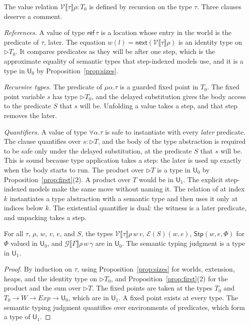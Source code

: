 \documentclass[acmsmall,nonacm,screen]{acmart}
\newcommand{\later}{{\triangleright}}
\newcommand{\nxt}{\mathsf{next}}
\newcommand{\Uv}{\mathsf{U}}
\newcommand{\sem}[1]{\llbracket #1 \rrbracket}
\newcommand{\kw}[1]{\mathsf{#1}}
\newcommand{\Exp}{\mathit{Exp}}
\newcommand{\Wld}{W}
\newcommand{\Pred}{T}
\newcommand{\Stp}{\mathsf{Stp}}
\newcommand{\Er}{\mathcal{E}}
\newcommand{\Vr}{\mathcal{V}}
\newcommand{\Gr}{\mathcal{G}}
\begin{document}
The value relation $\Vr\sem{\tau}\rho : \Pred_0$ is defined by recursion on the type
$\tau$. Three clauses deserve a comment.

\emph{References.} A value of type $\kw{ref}\,\tau$ is a location whose entry in the world
is the predicate of $\tau$, later. The equation $w(l) = \nxt(\Vr\sem{\tau}\rho)$ is an
identity type on $\later\Pred_0$. It compares predicates as they will be after one step,
which is the approximate equality of semantic types that step-indexed models use, and it is
a type in $\Uv_0$ by Proposition~\ref{prop:sizes}.

\emph{Recursive types.} The predicate of $\mu\alpha.\tau$ is a guarded fixed point in
$\Pred_0$. The fixed point variable $s$ has type $\later\Pred_0$, and the delayed
substitution gives the body access to the predicate $S$ that $s$ will be. Unfolding a
value takes a step, and that step removes the later.

\emph{Quantifiers.} A value of type $\forall\alpha.\tau$ is safe to instantiate with every
\emph{later} predicate. The clause quantifies over $s : \later\Pred$, and the body of the
type abstraction is required to be safe only under the delayed substitution, at the
predicate $S$ that $s$ will be. This is sound because type application takes a step: the
later is used up exactly when the body starts to run. The product over $\later\Pred$ is a
type in $\Uv_0$ by Proposition~\ref{prop:first}(2). A product over $\Pred$ would be in
$\Uv_1$. The explicit step-indexed models make the same move without naming it. The
relation of \citet{Ahmed2006} at index $k$ instantiates a type abstraction with a semantic
type and then uses it only at indices below $k$. The existential quantifier is dual: the
witness is a later predicate, and unpacking takes a step.

\begin{proposition}\label{prop:lr-sizes}
For all $\tau$, $\rho$, $w$, $v$, $e$, and $S$, the types $\Vr\sem{\tau}\rho\,w\,v$,
$\Er(S)(w,e)$, $\Stp(w,e,\Phi)$ for $\Phi$ valued in $\Uv_0$, and $\Gr\sem{\Gamma}\rho\,w\,\gamma$
are in $\Uv_0$. The semantic typing judgment is a type in $\Uv_1$.
\end{proposition}

\begin{proof}
By induction on $\tau$, using Proposition~\ref{prop:sizes} for worlds, extension, heaps, and
the identity type on $\later\Pred_0$, and Proposition~\ref{prop:first}(2) for the product
and the sum over $\later\Pred$. The fixed points are taken at the types
$\Pred_0$ and $\Pred_0 \to \Wld \to \Exp \to \Uv_0$, which are in $\Uv_1$. A fixed point
exists at every type. The semantic typing judgment quantifies over environments of
predicates, which form a type of $\Uv_1$.
\end{proof}
\end{document}
